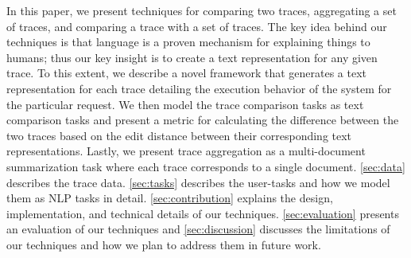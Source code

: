 In this paper, we present techniques for comparing two traces, aggregating a set of traces, and comparing
a trace with a set of traces. The key idea behind our techniques is that language is a proven mechanism
for explaining things to humans; thus our key insight is to create a text representation for any given trace.
To this extent, we describe a novel framework that generates a text representation
for each trace detailing the execution behavior of the system for the particular request. We then
model the trace comparison tasks as text comparison tasks and present a metric for calculating
the difference between the two traces based on the edit distance between their corresponding text representations.
Lastly, we present trace aggregation as a multi-document summarization task where each trace corresponds
to a single document. \autoref{sec:data} describes the trace data. \autoref{sec:tasks} describes
the user-tasks and how we model them as NLP tasks in detail. \autoref{sec:contribution} explains
the design, implementation, and technical details of our techniques. \autoref{sec:evaluation} presents
an evaluation of our techniques and \autoref{sec:discussion} discusses the limitations of our techniques
and how we plan to address them in future work.
